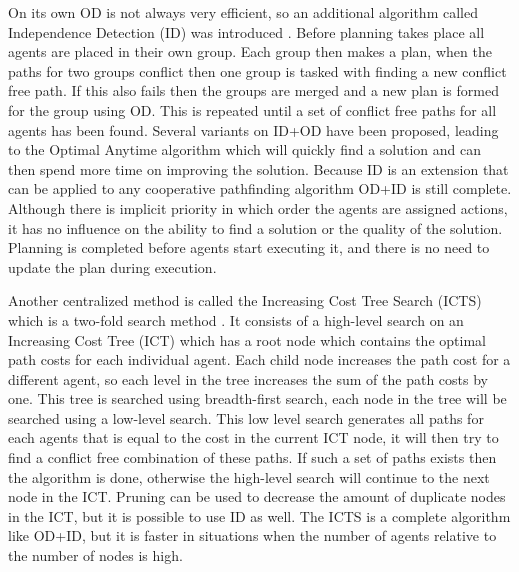 On its own OD is not always very efficient, so an additional algorithm called
Independence Detection (ID) was introduced \cite{standley2010}. Before planning
takes place all agents are placed in their own group. Each group then makes a
plan, when the paths for two groups conflict then one group is tasked with
finding a new conflict free path. If this also fails then the groups are merged
and a new plan is formed for the group using OD. This is repeated until a
set of conflict free paths for all agents has been found. Several variants on
ID+OD have been proposed, leading to the Optimal Anytime algorithm
\cite{standley2011} which will quickly find a solution and can then spend more
time on improving the solution. Because ID is an extension that can be applied
to any cooperative pathfinding algorithm OD+ID is still complete. Although
there is implicit priority in which order the agents are assigned actions, it
has no influence on the ability to find a solution or the quality of the
solution. Planning is completed before agents start executing it, and there is
no need to update the plan during execution.

Another centralized method is called the Increasing Cost Tree Search (ICTS)
which is a
two-fold search method \cite{sharon2013}. It consists of a high-level search on
an Increasing Cost Tree (ICT) which has a root node which contains the optimal
path costs for each individual agent. Each child node increases the path cost
for a different agent, so each level in the tree increases the sum of the path
costs by one. This tree is searched using breadth-first search, each node in
the tree will be searched using a low-level search. This low level search
generates all paths for each agents that is equal to the cost in the current
ICT node, it will then try to find a conflict free combination of these paths.
If such a set of paths exists then the algorithm is done, otherwise the
high-level search will continue to the next node in the ICT. Pruning can be
used to decrease the amount of duplicate nodes in the ICT, but it is possible
to use ID as well. The ICTS is a complete algorithm like OD+ID, but it is
faster in situations when the number of agents relative to the number of nodes
is high.


